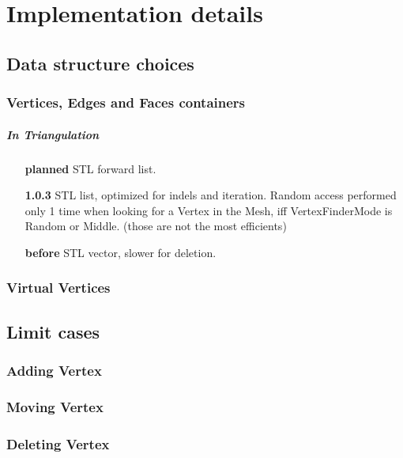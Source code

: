 \documentclass{report}
\begin{document}
\chapter{Implementation details}

\section{Data structure choices}
\subsection{Vertices, Edges and Faces containers}
    \paragraph*{In Triangulation}
    \begin{enumerate}
        \item[\textbf{planned}] STL forward list.
        \item[\textbf{1.0.3 }] STL list, optimized for indels and iteration. Random access performed only 1 time when looking for a Vertex in the Mesh, iff VertexFinderMode is Random or Middle. (those are not the most efficients)
        \item[\textbf{before}] STL vector, slower for deletion.
    \end{enumerate}

\subsection{Virtual Vertices}
    \paragraph*{}


\section{Limit cases}
\subsection{Adding Vertex}
    \paragraph*{}
\subsection{Moving Vertex}
    \paragraph*{}
\subsection{Deleting Vertex}
    \paragraph*{}
    \paragraph*{}
\end{document}

